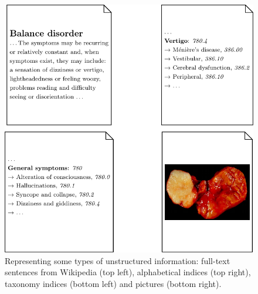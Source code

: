 \begin{figure}
	\centering
	\includegraphics[scale=0.7]{fig/01dataint/foldedfulltext}
	\caption{Representing some types of unstructured information: full-text sentences from Wikipedia (top left), alphabetical indices (top right), taxonomy indices (bottom left) and pictures (bottom right).}
	\label{fig:unstructuredmedical}
\end{figure}


